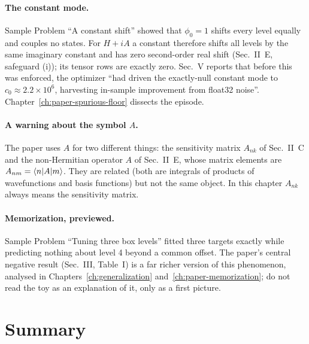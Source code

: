 \paragraph{The constant mode.}
Sample Problem ``A constant shift'' showed that $\phi_0=1$ shifts every level equally and couples no states. For $H+iA$ a constant therefore shifts all levels by the same imaginary constant and has zero second-order real shift (Sec.~II~E, safeguard (i)); its tensor rows are exactly zero. Sec.~V reports that before this was enforced, the optimizer ``had driven the exactly-null constant mode to $c_0\approx2.2\times10^{6}$, harvesting in-sample improvement from float32 noise''. Chapter~\ref{ch:paper-spurious-floor} dissects the episode.

\paragraph{A warning about the symbol $A$.}
The paper uses $A$ for two different things: the sensitivity matrix $A_{nk}$ of Sec.~II~C and the non-Hermitian operator $A$ of Sec.~II~E, whose matrix elements are $A_{nm}=\langle n|A|m\rangle$. They are related (both are integrals of products of wavefunctions and basis functions) but not the same object. In this chapter $A_{nk}$ always means the sensitivity matrix.

\paragraph{Memorization, previewed.}
Sample Problem ``Tuning three box levels'' fitted three targets exactly while predicting nothing about level 4 beyond a common offset. The paper's central negative result (Sec.~III, Table~I) is a far richer version of this phenomenon, analysed in Chapters~\ref{ch:generalization} and~\ref{ch:paper-memorization}; do not read the toy as an explanation of it, only as a first picture.

\section{Summary}\label{sec:perturbation-summary}

